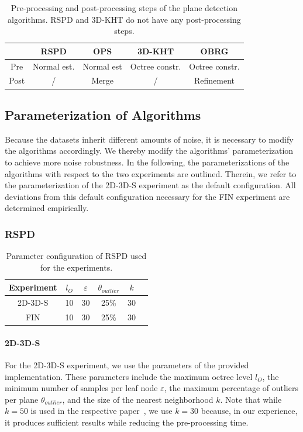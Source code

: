 \documentclass[main.tex]{subfiles}
\begin{document}
\begin{table}[H]
    \centering
    \begin{tabular}{c|cccc}
             & RSPD        & OPS        & 3D-KHT         & OBRG           \\ \hline
        Pre  & Normal est. & Normal est & Octree constr. & Octree constr. \\
        Post & /           & Merge      & /              & Refinement
    \end{tabular}
    \caption{Pre-processing and post-processing steps of the plane detection algorithms. RSPD and 3D-KHT do not have any post-processing steps.}
    \label{tab:pre-post}
\end{table}


\subsection{Parameterization of Algorithms}
Because the datasets inherit different amounts of noise, it is necessary to modify the algorithms accordingly.
We thereby modify the algorithms' parameterization to achieve more noise robustness.
In the following, the parameterizations of the algorithms with respect to the two experiments are outlined.
Therein, we refer to the parameterization of the 2D-3D-S experiment as the default configuration.
All deviations from this default configuration necessary for the FIN experiment are determined empirically.


\subsubsection{RSPD}

\begin{table}[H]
    \centering
    \begin{tabular}{c|ccccc}
        Experiment & $l_O$ & $\varepsilon$ & $\theta_{outlier}$ & $k$ \\ \hline
        2D-3D-S    & 10    & 30            & 25\%               & 30  \\
        FIN        & 10    & 30            & 25\%               & 30
    \end{tabular}%
    \caption{Parameter configuration of RSPD used for the experiments.}
    \label{tab:rspd-param}
\end{table}


\paragraph{2D-3D-S}
For the 2D-3D-S experiment, we use the parameters of the provided implementation. These parameters include the maximum octree level $l_O$,
the minimum number of samples per leaf node $\varepsilon$, the maximum percentage of outliers per plane $\theta_{outlier}$, and
the size of the nearest neighborhood $k$. Note that while $k=50$ is used in the respective paper~\cite[Section~3.3]{Araújo_Oliveira_2020},
we use $k=30$ because, in our experience, it produces sufficient results while reducing the pre-processing time.
\end{document}
